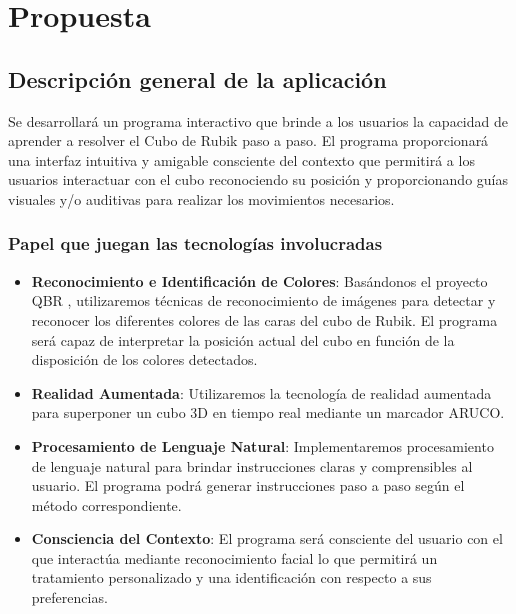 \chapter{Propuesta}

\section{Descripción general de la aplicación}

Se desarrollará un programa interactivo que brinde a los usuarios la capacidad
de aprender a resolver el Cubo de Rubik paso a paso. El programa proporcionará
una interfaz intuitiva y amigable consciente del contexto que permitirá a los
usuarios interactuar con el cubo reconociendo su posición y proporcionando guías
visuales y/o auditivas para realizar los movimientos necesarios.

\subsection{Papel que juegan las tecnologías involucradas}

\begin{itemize}
\item{\textbf{Reconocimiento e Identificación de Colores}: Basándonos el proyecto QBR \cite{QBR},
utilizaremos técnicas de reconocimiento de imágenes para detectar y reconocer
los diferentes colores de las caras del cubo de Rubik. El programa será capaz de
interpretar la posición actual del cubo en función de la disposición de los
colores detectados.}

\item{ \textbf{Realidad Aumentada}: Utilizaremos la tecnología de realidad aumentada para
superponer un cubo 3D en tiempo real mediante un marcador ARUCO.}

\item{ \textbf{Procesamiento de Lenguaje Natural}: Implementaremos procesamiento de lenguaje
natural para brindar instrucciones claras y comprensibles al usuario. El
programa podrá generar instrucciones paso a paso según el método correspondiente.}

\item{ \textbf{Consciencia del Contexto}: El programa será consciente del usuario con el que
interactúa mediante reconocimiento facial lo que permitirá un tratamiento
personalizado y una identificación con respecto a sus preferencias.}


\end{itemize}